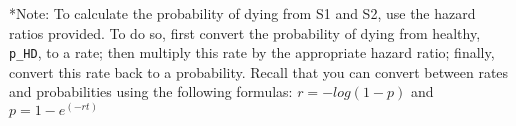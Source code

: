 \documentclass[
]{article}
\begin{document}
*Note: To calculate the probability of dying from S1 and S2, use the
hazard ratios provided. To do so, first convert the probability of dying
from healthy, \texttt{p\_HD}, to a rate; then multiply this rate by the
appropriate hazard ratio; finally, convert this rate back to a
probability. Recall that you can convert between rates and probabilities
using the following formulas: \(r = -log(1-p)\) and \(p = 1-e^{(-rt)}\)
\end{document}
